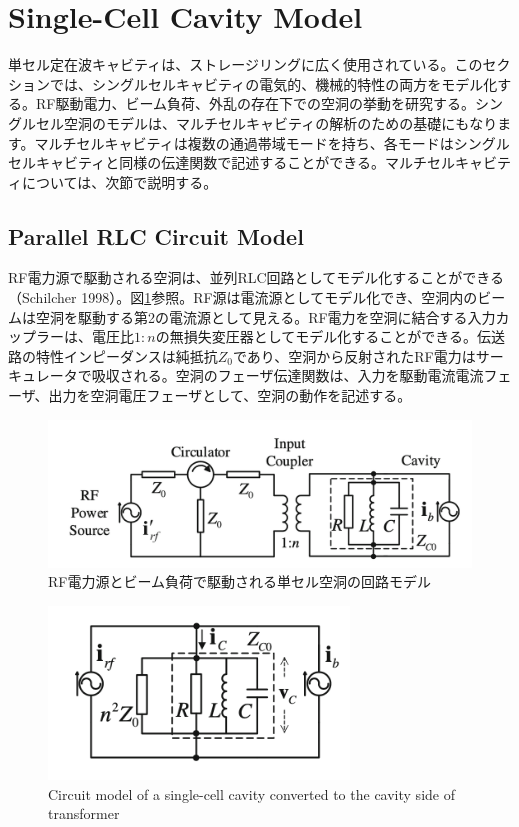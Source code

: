 \documentclass[book]{jlreq}
\begin{document}
\section{Single-Cell Cavity Model}

単セル定在波キャビティは、ストレージリングに広く使用されている。このセクションでは、シングルセルキャビティの電気的、機械的特性の両方をモデル化する。RF駆動電力、ビーム負荷、外乱の存在下での空洞の挙動を研究する。シングルセル空洞のモデルは、マルチセルキャビティの解析のための基礎にもなります。マルチセルキャビティは複数の通過帯域モードを持ち、各モードはシングルセルキャビティと同様の伝達関数で記述することができる。マルチセルキャビティについては、次節で説明する。

\subsection{Parallel RLC Circuit Model}

RF電力源で駆動される空洞は、並列RLC回路としてモデル化することができる（Schilcher 1998）。図\ref{Fig3.6}参照。RF源は電流源としてモデル化でき、空洞内のビームは空洞を駆動する第2の電流源として見える。RF電力を空洞に結合する入力カップラーは、電圧比$1:n$の無損失変圧器としてモデル化することができる。伝送路の特性インピーダンスは純抵抗$Z_0$であり、空洞から反射されたRF電力はサーキュレータで吸収される。空洞のフェーザ伝達関数は、入力を駆動電流電流フェーザ、出力を空洞電圧フェーザとして、空洞の動作を記述する。
%
\begin{figure}[hbt]
    \begin{center}
      \includegraphics[width=12cm,clip]{figs/Fig3.6.png}
      \caption{RF電力源とビーム負荷で駆動される単セル空洞の回路モデル}
     \label{Fig3.6}
    \end{center}
\end{figure}
%
\begin{figure}[hbt]
    \begin{center}
      \includegraphics[width=8cm,clip]{figs/Fig3.7.png}
      \caption{Circuit model of a single-cell cavity converted to the cavity side of transformer}
     \label{Fig3.7}
    \end{center}
\end{figure}
\end{document}
